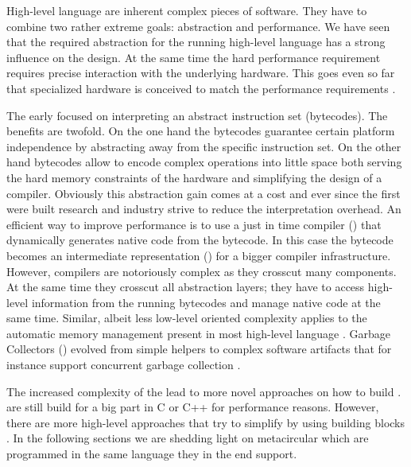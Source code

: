 High-level language \VMs are inherent complex pieces of software.
They have to combine two rather extreme goals: abstraction and performance.
We have seen that the required abstraction for the running high-level language has a strong influence on the \VM design.
At the same time the hard performance requirement requires precise interaction with the underlying hardware.
This goes even so far that specialized hardware is conceived to match the performance requirements \cite{??,Azul,ST}.

The early \VMs focused on interpreting an abstract instruction set (bytecodes).
The benefits are twofold.
On the one hand the bytecodes guarantee certain platform independence by abstracting away from the \CPU specific instruction set.
On the other hand bytecodes allow to encode complex operations into little space both serving the hard memory constraints of the hardware and simplifying the design of a compiler.
Obviously this abstraction gain comes at a cost and ever since the first \VMs were built research and industry strive to reduce the interpretation overhead.
An efficient way to improve performance is to use a just in time compiler (\JIT) that dynamically generates native code from the bytecode.
In this case the bytecode becomes an intermediate representation (\IR) for a bigger compiler infrastructure.
However, \JIT compilers are notoriously complex as they crosscut many \VM components.
At the same time they crosscut all abstraction layers; they have to access high-level information from the running bytecodes and manage native code at the same time.
Similar, albeit less low-level oriented complexity applies to the automatic memory management present in most high-level language \VMs.
Garbage Collectors (\GC) evolved from simple helpers to complex software artifacts that for instance support concurrent garbage collection \cite{azul}.

The increased complexity of the \VMs lead to more novel approaches on how to build \VMs.
\VMs are still build for a big part in C or C++ for performance reasons.
However, there are more high-level approaches that try to simplify \VMs by using building blocks \cite{??}.
In the following sections we are shedding light on metacircular \VMs which are programmed in the same language they in the end support.
\\
 \\
\\

